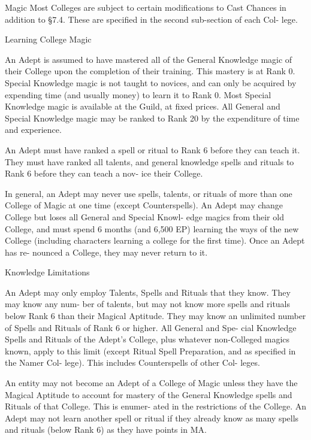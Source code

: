 \begin{Chapter}{Magic}
Most Colleges  are  subject  to  certain modifications 
to  Cast  Chances  in  addition  to  §7.4.  These  are 
specified  in  the  second  sub-section  of  each  Col-
lege. 

Learning College Magic 

An  Adept  is  assumed  to  have  mastered  all  of  the 
General  Knowledge  magic  of  their  College  upon 
the completion of their training. This mastery is at 
Rank 0. Special Knowledge magic is not taught to 
novices,  and  can  only  be  acquired  by  expending 
time  (and  usually  money)  to  learn  it  to  Rank  0. 
Most  Special  Knowledge  magic  is  available  at the 
Guild,  at  fixed  prices.  All  General  and  Special 
Knowledge  magic  may  be  ranked  to  Rank  20  by 
the expenditure of time and experience. 

An  Adept  must  have  ranked  a  spell  or  ritual  to 
Rank  6  before  they  can  teach  it.  They  must  have 
ranked  all  talents,  and  general  knowledge  spells 
and rituals to Rank 6 before they can teach a nov-
ice their College. 

In general, an Adept may never use spells, talents, 
or rituals of more than one College of Magic at one 
time (except Counterspells). An Adept may change 
College  but  loses  all  General  and  Special  Knowl-
edge  magics  from  their  old  College,  and  must 
spend 6  months  (and  6,500  EP)  learning  the  ways 
of the new College (including characters learning a 
college  for  the  first  time).  Once  an  Adept  has  re-
nounced a College, they may never return to it. 

Knowledge Limitations 

An  Adept  may  only  employ  Talents,  Spells  and 
Rituals that they know. They may know any num-
ber  of  talents,  but  may  not  know  more  spells  and 
rituals  below  Rank  6  than  their  Magical  Aptitude. 
They may know an unlimited number of Spells and 
Rituals of Rank 6 or higher. All  General and Spe-
cial  Knowledge  Spells  and  Rituals  of  the  Adept’s 
College,  plus  whatever  non-Colleged  magics 
known,  apply  to  this  limit  (except  Ritual  Spell 
Preparation,  and  as  specified  in  the  Namer  Col-
lege).  This  includes  Counterspells  of  other  Col-
leges. 

An  entity  may  not  become  an  Adept  of  a  College 
of Magic unless they have the Magical Aptitude to 
account  for  mastery  of  the  General  Knowledge 
spells and Rituals of that College.  This is enumer-
ated  in  the  restrictions  of  the  College.  An  Adept 
may not learn another spell or ritual if they already 
know as many spells and rituals (below Rank 6) as 
they have points in MA. 


\end{Chapter}
